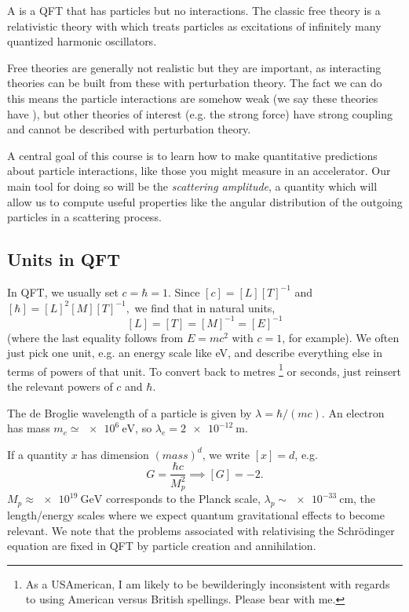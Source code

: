 \begin{defn}
A  is a QFT that has particles but no interactions. The classic free theory is a relativistic theory with which treats particles as excitations of infinitely many quantized harmonic oscillators.
\end{defn}
Free theories are generally not realistic but they are important, as interacting theories can be built from these with perturbation theory. The fact we can do this means the particle interactions are somehow weak (we say these theories have ), but other theories of interest (e.g. the strong force) have strong coupling and cannot be described with perturbation theory.

A central goal of this course is to learn how to make quantitative predictions about particle interactions, like those you might measure in an accelerator. Our main tool for doing so will be the \emph{scattering amplitude}, a quantity which will allow us to compute useful properties like the angular distribution of the outgoing particles in a scattering process.

\subsection*{Units in QFT} In QFT, we usually set $c=\hbar=1$. Since $[c]=[L][T]^{-1}$ and $[\hbar]=[L]^2[M][T]^{-1},$ we find that in natural units, $$[L]=[T]=[M]^{-1}=[E]^{-1}$$ (where the last equality follows from $E=mc^2$ with $c=1$, for example). We often just pick one unit, e.g. an energy scale like \si{\electronvolt}, and describe everything else in terms of powers of that unit. To convert back to metres%
    \footnote{As a USAmerican, I am likely to be bewilderingly inconsistent with regards to using American versus British spellings. Please bear with me.}
or seconds, just reinsert the relevant powers of $c$ and $\hbar$.

\begin{exm}
The de Broglie wavelength of a particle is given by $\lambda=\hbar/(mc)$. An electron has mass $m_e\simeq \SI{e6}{\electronvolt}$, so $\lambda_e = \SI{2e-12}{\meter}$.
\end{exm}

If a quantity $x$ has dimension $(mass)^d$, we write $[x]=d$, e.g. $$G=\frac{\hbar c}{M_p^2}\implies [G]=-2.$$  $M_p \approx \SI{e19}{\giga\electronvolt}$ corresponds to the Planck scale, $\lambda_p \sim \SI{e-33}{\centi\meter}$, the length/energy scales where we expect quantum gravitational effects to become relevant. We note that the problems associated with relativising the Schr\"odinger equation are fixed in QFT by particle creation and annihilation.

